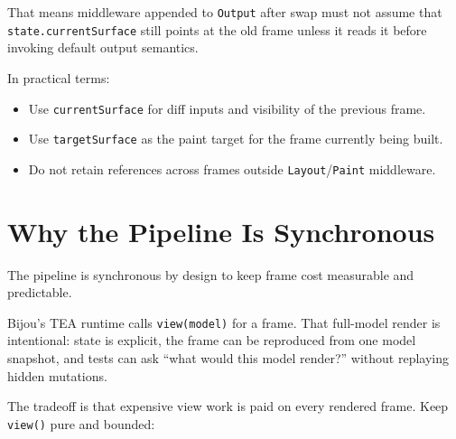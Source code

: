 That means middleware appended to \texttt{O\allowbreak{}u\allowbreak{}t\allowbreak{}p\allowbreak{}u\allowbreak{}t} after swap must not assume that \texttt{s\allowbreak{}t\allowbreak{}a\allowbreak{}t\allowbreak{}e\allowbreak{}.\allowbreak{}c\allowbreak{}u\allowbreak{}r\allowbreak{}r\allowbreak{}e\allowbreak{}n\allowbreak{}t\allowbreak{}S\allowbreak{}u\allowbreak{}r\allowbreak{}f\allowbreak{}a\allowbreak{}c\allowbreak{}e} still points at the old frame unless it reads it before invoking default output semantics.

In practical terms:

\begin{itemize}
\tightlist
\item
  Use \texttt{c\allowbreak{}u\allowbreak{}r\allowbreak{}r\allowbreak{}e\allowbreak{}n\allowbreak{}t\allowbreak{}S\allowbreak{}u\allowbreak{}r\allowbreak{}f\allowbreak{}a\allowbreak{}c\allowbreak{}e} for diff inputs and visibility of the previous frame.
\item
  Use \texttt{t\allowbreak{}a\allowbreak{}r\allowbreak{}g\allowbreak{}e\allowbreak{}t\allowbreak{}S\allowbreak{}u\allowbreak{}r\allowbreak{}f\allowbreak{}a\allowbreak{}c\allowbreak{}e} as the paint target for the frame currently being built.
\item
  Do not retain references across frames outside \texttt{L\allowbreak{}a\allowbreak{}y\allowbreak{}o\allowbreak{}u\allowbreak{}t}/\texttt{P\allowbreak{}a\allowbreak{}i\allowbreak{}n\allowbreak{}t} middleware.
\end{itemize}

\section{Why the Pipeline Is Synchronous}\label{record-014-why-the-pipeline-is-synchronous}

The pipeline is synchronous by design to keep frame cost measurable and predictable.

Bijou's TEA runtime calls \texttt{v\allowbreak{}i\allowbreak{}e\allowbreak{}w\allowbreak{}(\allowbreak{}m\allowbreak{}o\allowbreak{}d\allowbreak{}e\allowbreak{}l\allowbreak{})} for a frame. That full-model render is intentional: state is explicit, the frame can be reproduced from one model snapshot, and tests can ask ``what would this model render?'' without replaying hidden mutations.

The tradeoff is that expensive view work is paid on every rendered frame. Keep \texttt{v\allowbreak{}i\allowbreak{}e\allowbreak{}w\allowbreak{}(\allowbreak{})} pure and bounded:

